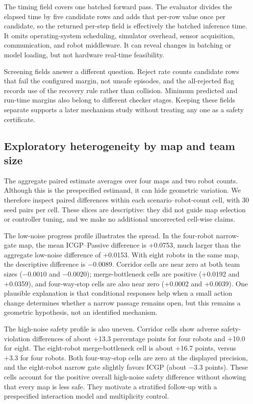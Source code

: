 \documentclass[pdflatex,sn-mathphys-num]{sn-jnl}
\begin{document}
The timing field covers one batched forward pass. The evaluator divides the elapsed time by five candidate rows and adds that per-row value once per candidate, so the returned per-step field is effectively the batched inference time. It omits operating-system scheduling, simulator overhead, sensor acquisition, communication, and robot middleware. It can reveal changes in batching or model loading, but not hardware real-time feasibility.

Screening fields answer a different question. Reject rate counts candidate rows that fail the configured margin, not unsafe episodes, and the all-rejected flag records use of the recovery rule rather than collision. Minimum predicted and run-time margins also belong to different checker stages. Keeping these fields separate supports a later mechanism study without treating any one as a safety certificate.

\subsection{Exploratory heterogeneity by map and team size}

The aggregate paired estimate averages over four maps and two robot counts. Although this is the prespecified estimand, it can hide geometric variation. We therefore inspect paired differences within each scenario--robot-count cell, with 30 seed pairs per cell. These slices are descriptive: they did not guide map selection or controller tuning, and we make no additional uncorrected cell-wise claims.

The low-noise progress profile illustrates the spread. In the four-robot narrow-gate map, the mean ICGP--Passive difference is +0.0753, much larger than the aggregate low-noise difference of +0.0153. With eight robots in the same map, the descriptive difference is $-0.0089$. Corridor cells are near zero at both team sizes ($-0.0010$ and $-0.0020$); merge-bottleneck cells are positive (+0.0192 and +0.0359), and four-way-stop cells are also near zero (+0.0002 and +0.0039). One plausible explanation is that conditional responses help when a small action change determines whether a narrow passage remains open, but this remains a geometric hypothesis, not an identified mechanism.

The high-noise safety profile is also uneven. Corridor cells show adverse safety-violation differences of about +13.3 percentage points for four robots and +10.0 for eight. The eight-robot merge-bottleneck cell is about +16.7 points, versus +3.3 for four robots. Both four-way-stop cells are zero at the displayed precision, and the eight-robot narrow gate slightly favors ICGP (about $-3.3$ points). These cells account for the positive overall high-noise safety difference without showing that every map is less safe. They motivate a stratified follow-up with a prespecified interaction model and multiplicity control.
\end{document}
